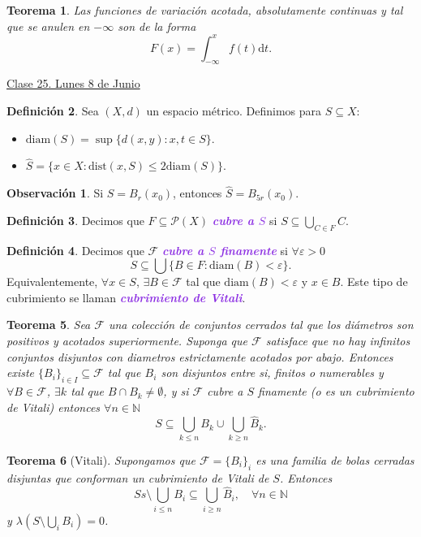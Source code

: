\documentclass{article}
\newtheorem{theorem}{Teorema}[subsection]
\theoremstyle{definition}
\newtheorem{definition}[theorem]{Definición}
\newtheorem*{obs}{Observación}
\theoremstyle{remark}
\numberwithin{equation}{section}
\newcommand{\N}{\mathbb{N}}
\renewcommand{\P}{\mathcal{P}}
\newcommand{\Fcal}{\mathcal{F}}
\renewcommand{\d}{\mathrm{d}}
\newcommand{\e}{\varepsilon}
\newcommand{\lam}{\lambda}
\newcommand{\oo}{\infty}
\newcommand{\dist}{\mathrm{dist}}
\newcommand{\diam}{\mathrm{diam}}
\renewcommand{\hat}{\widehat}
\newcommand{\br}[1]{\left( #1 \right)}
\newcommand{\wea}[1]{\textcolor{BlueViolet}{\textbf{\emph{#1}}}}
\newcommand{\fecha}[1]{\begin{flushright} \underline{#1} \end{flushright}}
\begin{document}
\begin{theorem}
  Las funciones de variación acotada, absolutamente continuas y tal que se anulen en $-\oo$ son de la forma
  \[ F(x) = \int_{-\oo}^x f(t) \d t. \]
\end{theorem}

\fecha{Clase 25. Lunes 8 de Junio}

\begin{definition}
  Sea $(X,d)$ un espacio métrico. Definimos para $S \subseteq X$:
  \begin{itemize}
    \item $\diam(S) = \sup\{d(x,y) : x,t \in S\}$.
    \item $\hat S = \{x \in X : \dist(x,S) \leq 2 \diam(S)\}$.
  \end{itemize}
\end{definition}

\begin{obs}
  Si $S = B_r(x_0)$, entonces $\hat S = B_{5r}(x_0)$.
\end{obs}

\begin{definition}
  Decimos que $F \subseteq \P(X)$ \wea{cubre a $S$} si $S \subseteq \bigcup_{C \in F} C$.
\end{definition}

\begin{definition}
  Decimos que $\Fcal$ \wea{cubre a $S$ finamente} si $\forall \e>0$
  \[ S \subseteq \bigcup \{B \in F : \diam(B) < \e\}. \]
  Equivalentemente, $\forall x \in S$, $\exists B \in \Fcal$ tal que $\diam(B) < \e$ y $x \in B$.
  Este tipo de cubrimiento se llaman \wea{cubrimiento de Vitali}.
\end{definition}

\begin{theorem}
  Sea $\Fcal$ una colección de conjuntos cerrados tal que los diámetros son positivos y acotados superiormente.
  Suponga que $\Fcal$ satisface que no hay infinitos conjuntos disjuntos con diametros estrictamente acotados por abajo.
  Entonces existe $\{B_i\}_{i\in I} \subseteq \Fcal$ tal que $B_i$ son disjuntos entre si, finitos o numerables y $\forall B \in \Fcal$, $\exists k$ tal que $B \cap B_k \neq \emptyset$, y si $\Fcal$ cubre a $S$ finamente (o es un cubrimiento de Vitali) entonces $\forall n \in \N$
  \[ S \subseteq \bigcup_{k \leq n} B_k \cup \bigcup_{k \geq n} \hat B_k. \]
\end{theorem}

\begin{theorem}
  [Vitali]
  Supongamos que $\Fcal = \{B_i\}_i$ es una familia de bolas cerradas disjuntas que conforman un cubrimiento de Vitali de $S$. Entonces
  \[ S s\setminus \bigcup_{i \leq n} B_i \subseteq \bigcup_{i \geq n} \hat B_i, \quad \forall n \in \N \]
  y $\lam\br{S \setminus \bigcup_i B_i} = 0$.
\end{theorem}

\end{document}
